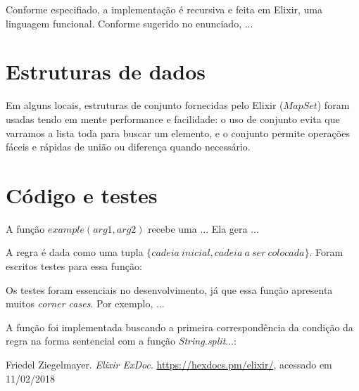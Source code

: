 \documentclass[conference]{IEEEtran}
\begin{document}
Conforme especifiado, a implementação é recursiva e feita em Elixir, uma linguagem funcional. Conforme sugerido no enunciado, ...

\section{Estruturas de dados}

Em alguns locais, estruturas de conjunto fornecidas pelo Elixir ($MapSet$) foram usadas tendo em mente performance e facilidade: o uso de conjunto evita que varramos a lista toda para buscar um elemento, e o conjunto permite operações fáceis e rápidas de união ou diferença quando necessário.

\section{Código e testes}

A função $example(arg1, arg2)$ recebe uma ... Ela gera ...

A regra é dada como uma tupla $\{cadeia\ inicial, cadeia\ a\ ser\ colocada\}$. Foram escritos testes para essa função:

% 

Os testes foram essenciais no desenvolvimento, já que essa função apresenta muitos \emph{corner cases}. Por exemplo, ...

A função foi implementada buscando a primeira correspondência da condição da regra na forma sentencial com a função \emph{String.split}...:

% 

\begin{thebibliography}{1}
Friedel Ziegelmayer. \emph{Elixir ExDoc}. \url{https://hexdocs.pm/elixir/}, acessado em 11/02/2018
\end{thebibliography}
\end{document}

